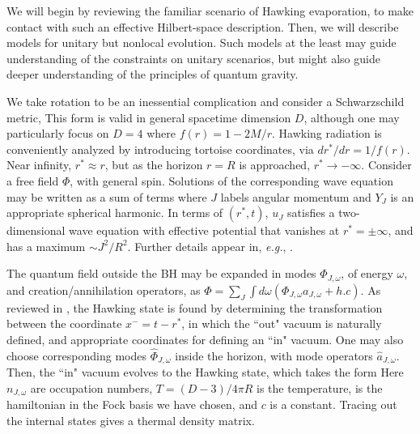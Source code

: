 We will begin by reviewing the familiar scenario of Hawking evaporation\Hawkrad, to make contact with such an effective Hilbert-space description.  Then, we will describe models for unitary but nonlocal evolution.  Such models at the least may guide understanding of the constraints on unitary scenarios, but might also guide deeper understanding of the principles of quantum gravity.



We take rotation to be an inessential complication and consider a Schwarzschild metric,
%
\eqn{}
%
This form is valid in general spacetime dimension $D$, although one may particularly focus on $D=4$ where $f(r)= 1-2M/r$.  Hawking radiation is conveniently analyzed by introducing tortoise coordinates, via $dr^*/dr = 1/f(r)$.  Near infinity, $r^*\approx r$, but as the horizon $r=R$  is approached, $r^*\rightarrow -\infty$.  Consider a free field $\Phi$, with general spin.  Solutions of the corresponding wave equation may be written as a sum of terms
%
\eqn{}
%
where $J$ labels angular momentum and $Y_J$ is an appropriate spherical harmonic.  In terms of $(r^*,t)$, $u_J$ satisfies a two-dimensional wave equation with  effective potential that vanishes at $r^*=\pm\infty$, and has a maximum $\sim J^2/R^2$.  Further details appear in, {\it e.g.}, .

The quantum field outside the BH may be expanded in modes $\Phi_{J,\omega}$, of energy $\omega$, and creation/annihilation operators, as $\Phi=\sum_J\int d\omega (\Phi_{J,\omega} a_{J,\omega}+h.c)$.  As reviewed in \SGTrieste, the Hawking state is found by determining the transformation between the coordinate $x^-=t-r^*$, in which the ``out" vacuum is naturally defined, and appropriate coordinates for defining an ``in" vacuum.  One may also choose corresponding modes ${\hat \Phi}_{J,\omega}$ inside the horizon, with mode operators ${\hat a}_{J,\omega}$.  Then, the ``in" vacuum evolves to the Hawking state, which takes the form
%
\eqn{}
%
Here $n_{J,\omega}$ are occupation numbers, $T=(D-3)/4\pi R$ is the temperature,
%
\eqn{}
%
is the hamiltonian in the Fock basis we have chosen, and  $c$ is a constant.  Tracing out the internal states gives a thermal density matrix.

